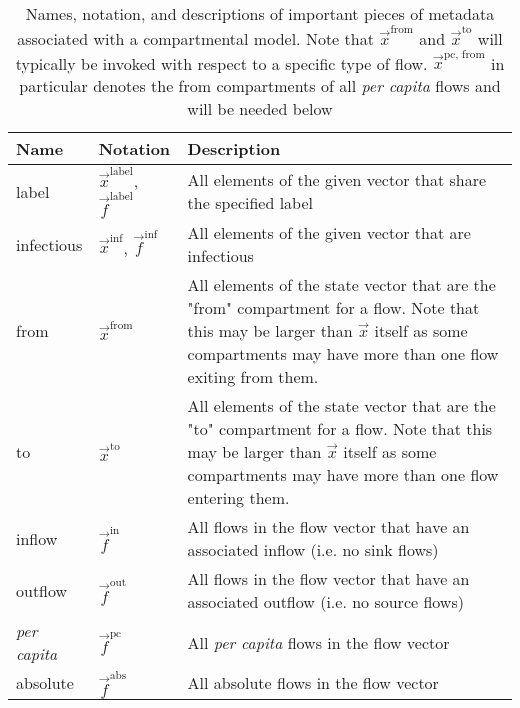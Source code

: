 \documentclass[referee,sn-basic]{sn-jnl}%
\theoremstyle{definition}
\newcommand{\xvec}{\vec{x}}
\newcommand{\fvec}{\vec{f}}
\begin{document}
\begin{table}
\centering
    \begin{tabular}{|m{1.5cm}|m{1.5cm}|m{30em}|}
        \hline
        Name & Notation & Description \\\hline
        label & $\xvec^{\text{label}}$, $\fvec^{\text{label}}$ & All elements of the given vector that share the specified label \\\hline
        infectious & $\xvec^{\text{inf}}$, $\fvec^{\text{inf}}$ & All elements of the given vector that are infectious \\\hline
        from & $\xvec^\text{from}$ & All elements of the state vector that are the "from" compartment for a flow. Note that this may be larger than $\xvec$ itself as some compartments may have more than one flow exiting from them. \\\hline
        to & $\xvec^\text{to}$ & All elements of the state vector that are the "to" compartment for a flow. Note that this may be larger than $\xvec$ itself as some compartments may have more than one flow entering them. \\\hline
        inflow & $\fvec^\text{in}$ & All flows in the flow vector that have an associated inflow (i.e. no sink flows) \\\hline
        outflow & $\fvec^\text{out}$ & All flows in the flow vector that have an associated outflow (i.e. no source flows) \\\hline
        \emph{per capita} & $\fvec^\text{pc}$ & All \emph{per capita} flows in the flow vector \\\hline
        absolute & $\fvec^\text{abs}$ & All absolute flows in the flow vector \\\hline
    \end{tabular}
    \caption{Names, notation, and descriptions of important pieces of metadata associated with a compartmental model. Note that $\xvec^\text{from}$ and $\xvec^\text{to}$ will typically be invoked with respect to a specific type of flow. $\xvec^\text{pc, from}$ in particular denotes the from compartments of all \emph{per capita} flows and will be needed below}
    \label{tab:projections}
\end{table}
    
\end{document}
